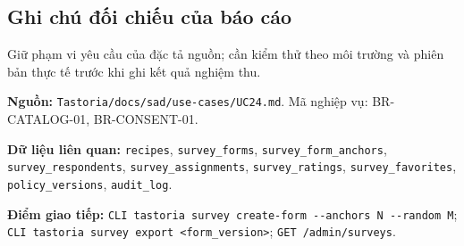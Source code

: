 \subsection{Ghi chú đối chiếu của báo cáo}
Giữ phạm vi yêu cầu của đặc tả nguồn; cần kiểm thử theo môi trường và phiên bản thực tế trước khi ghi kết quả nghiệm thu.

\textbf{Nguồn:} {\small\texttt{Tastoria/\allowbreak{}\allowbreak{}docs/\allowbreak{}\allowbreak{}sad/\allowbreak{}\allowbreak{}use-\allowbreak{}cases/\allowbreak{}\allowbreak{}UC24.\allowbreak{}md}}. Mã nghiệp vụ: BR-\allowbreak{}CATALOG-\allowbreak{}01, BR-\allowbreak{}CONSENT-\allowbreak{}01.

\textbf{Dữ liệu liên quan:} {\small\texttt{recipes}}, {\small\texttt{survey\_\allowbreak{}\allowbreak{}forms}}, {\small\texttt{survey\_\allowbreak{}\allowbreak{}form\_\allowbreak{}\allowbreak{}anchors}}, {\small\texttt{survey\_\allowbreak{}\allowbreak{}respondents}}, {\small\texttt{survey\_\allowbreak{}\allowbreak{}assignments}}, {\small\texttt{survey\_\allowbreak{}\allowbreak{}ratings}}, {\small\texttt{survey\_\allowbreak{}\allowbreak{}favorites}}, {\small\texttt{policy\_\allowbreak{}\allowbreak{}versions}}, {\small\texttt{audit\_\allowbreak{}\allowbreak{}log}}.

\textbf{Điểm giao tiếp:} {\small\texttt{CLI tastoria survey create-\allowbreak{}form -\allowbreak{}-\allowbreak{}anchors N -\allowbreak{}-\allowbreak{}random M}}; {\small\texttt{CLI tastoria survey export <form\_\allowbreak{}\allowbreak{}version>}}; {\small\texttt{GET /\allowbreak{}\allowbreak{}admin/\allowbreak{}\allowbreak{}surveys}}.

